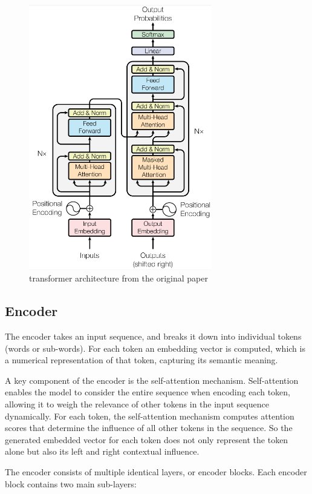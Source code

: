 \begin{figure}[h]
    
    \centering
    \includegraphics[width=8cm]{ressources/images/Transformer.png}
    \caption{transformer architecture from the original paper}
    \end{figure}
\subsection{Encoder}
The encoder takes an input sequence, and breaks it down into individual tokens (words or sub-words).
For each token an embedding vector is computed, which is a numerical representation of that token, capturing its semantic meaning.

A key component of the encoder is the self-attention mechanism. Self-attention enables the model to consider the entire sequence when encoding each token, allowing it to weigh the relevance of other tokens in the input sequence dynamically. For each token, the self-attention mechanism computes attention scores that determine the influence of all other tokens in the sequence. So the generated embedded vector for each token does not only represent the token alone but also its left and right contextual influence.


The encoder consists of multiple identical layers, or encoder blocks. Each encoder block contains two main sub-layers:

